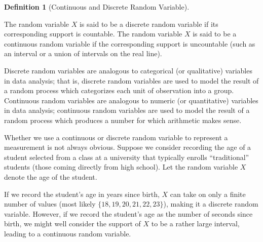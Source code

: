 \documentclass[
  letterpaper,
  DIV=11,
  numbers=noendperiod]{scrreprt}
\theoremstyle{definition}
\newtheorem{definition}{Definition}[chapter]
\theoremstyle{definition}
\theoremstyle{plain}
\theoremstyle{remark}
\begin{document}
\begin{definition}[Continuous and Discrete Random
Variable]\protect\hypertarget{def-rvtypes}{}\label{def-rvtypes}

The random variable \(X\) is said to be a discrete random variable if
its corresponding support is countable. The random variable \(X\) is
said to be a continuous random variable if the corresponding support is
uncountable (such as an interval or a union of intervals on the real
line).

\end{definition}

Discrete random variables are analogous to categorical (or qualitative)
variables in data analysis; that is, discrete random variables are used
to model the result of a random process which categorizes each unit of
observation into a group. Continuous random variables are analogous to
numeric (or quantitative) variables in data analysis; continuous random
variables are used to model the result of a random process which
produces a number for which arithmetic makes sense.

\begin{tcolorbox}[enhanced jigsaw, title=\textcolor{quarto-callout-warning-color}{\faExclamationTriangle}\hspace{0.5em}{Warning}, colbacktitle=quarto-callout-warning-color!10!white, titlerule=0mm, toptitle=1mm, breakable, bottomtitle=1mm, colframe=quarto-callout-warning-color-frame, opacitybacktitle=0.6, bottomrule=.15mm, arc=.35mm, toprule=.15mm, colback=white, rightrule=.15mm, coltitle=black, leftrule=.75mm, left=2mm, opacityback=0]

Whether we use a continuous or discrete random variable to represent a
measurement is not always obvious. Suppose we consider recording the age
of a student selected from a class at a university that typically
enrolls ``traditional'' students (those coming directly from high
school). Let the random variable \(X\) denote the age of the student.

If we record the student's age in years since birth, \(X\) can take on
only a finite number of values (most likely
\(\{18, 19, 20, 21, 22, 23\}\)), making it a discrete random variable.
However, if we record the student's age as the number of seconds since
birth, we might well consider the support of \(X\) to be a rather large
interval, leading to a continuous random variable.

\end{tcolorbox}
\end{document}
